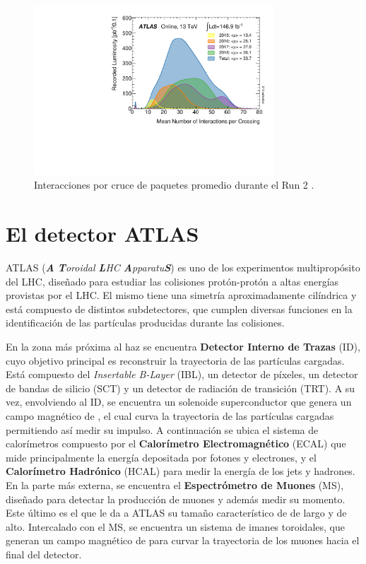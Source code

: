 \begin{figure}
  \centering
  \includegraphics[width=0.8\textwidth]{images/lhc/mu_2015_2018.pdf}
  \caption{Interacciones por cruce de paquetes promedio durante el Run 2 \cite{lumi_plot}.}
  \label{fig:pileup}
\end{figure}

\section{El detector ATLAS}


ATLAS (\textit{\textbf{A} \textbf{T}oroidal \textbf{L}HC \textbf{A}pparatu\textbf{S}})  \cite{PERF-2007-01} es uno de los experimentos multipropósito del LHC, diseñado para estudiar las colisiones protón-protón a altas energías provistas por el LHC. El mismo tiene una simetría aproximadamente cilíndrica y está compuesto de distintos subdetectores, que cumplen diversas funciones en la identificación de las partículas producidas durante las colisiones. 

En la zona más próxima al haz se encuentra \textbf{Detector Interno de Trazas} (ID), cuyo objetivo principal es reconstruir la trayectoria de las partículas cargadas. Está compuesto del \textit{Insertable B-Layer} (IBL), un detector de píxeles, un detector de bandas de silicio (SCT) y un detector de radiación de transición (TRT). A su vez, envolviendo al ID, se encuentra un solenoide superconductor que genera un campo magnético de , el cual curva la trayectoria de las partículas cargadas permitiendo así medir su impulso. A continuación se ubica el sistema de calorímetros compuesto por el \textbf{Calorímetro Electromagnético} (ECAL) que mide principalmente la energía depositada por fotones y electrones, y el \textbf{Calorímetro Hadrónico} (HCAL) para medir la energía de los jets y hadrones. En la parte más externa, se encuentra el \textbf{Espectrómetro de Muones} (MS), diseñado para detectar la producción de muones y además medir su momento. Este último es el que le da a ATLAS su tamaño característico de  de largo y  de alto. Intercalado con el MS, se encuentra un sistema de imanes toroidales, que generan un campo magnético de  para curvar la trayectoria de los muones hacia el final del detector.

